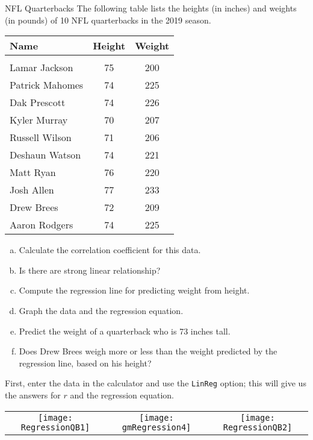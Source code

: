 \begin{example}[https://www.youtube.com/watch?v=onVpQyVN4pA&list=PLfmpjsIzhzttL_Uec2nCbDRcAcUF7NKG8&index=22]{NFL Quarterbacks}
The following table lists the heights (in inches) and weights (in pounds) of 10 NFL quarterbacks in the 2019 season.
\begin{center}
\begin{tabular}{l c c}
\textbf{Name} & \textbf{Height} & \textbf{Weight}\\
\hline
& & \\
Lamar Jackson & 75 & 200\\
Patrick Mahomes & 74 & 225\\
Dak Prescott & 74 & 226\\
Kyler Murray & 70 & 207\\
Russell Wilson & 71 & 206\\
Deshaun Watson & 74 & 221\\
Matt Ryan & 76 & 220\\
Josh Allen & 77 & 233\\
Drew Brees & 72 & 209\\
Aaron Rodgers & 74 & 225\\
\end{tabular}
\end{center}
\begin{enumerate}[(a)]
\item Calculate the correlation coefficient for this data.
\item Is there are strong linear relationship?
\item Compute the regression line for predicting weight from height.
\item Graph the data and the regression equation.
\item Predict the weight of a quarterback who is 73 inches tall.
\item Does Drew Brees weigh more or less than the weight predicted by the regression line, based on his height?
\end{enumerate}

\sol
First, enter the data in the calculator and use the \texttt{LinReg} option; this will give us the answers for $r$ and the regression equation.
\begin{center}
\begin{tabular}{c c c}
\texttt{[image: RegressionQB1]}
& \texttt{[image: gmRegression4]}
& \texttt{[image: RegressionQB2]}
\end{tabular}
\end{center}


\end{example}
